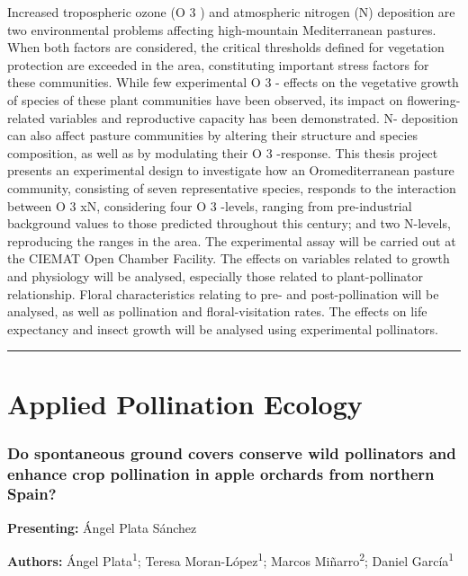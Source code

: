 \documentclass[
  letterpaper,
  DIV=11,
  numbers=noendperiod]{scrartcl}
\begin{document}
Increased tropospheric ozone (O 3 ) and atmospheric nitrogen (N)
deposition are two environmental problems affecting high-mountain
Mediterranean pastures. When both factors are considered, the critical
thresholds defined for vegetation protection are exceeded in the area,
constituting important stress factors for these communities. While few
experimental O 3 - effects on the vegetative growth of species of these
plant communities have been observed, its impact on flowering-related
variables and reproductive capacity has been demonstrated. N- deposition
can also affect pasture communities by altering their structure and
species composition, as well as by modulating their O 3 -response. This
thesis project presents an experimental design to investigate how an
Oromediterranean pasture community, consisting of seven representative
species, responds to the interaction between O 3 xN, considering four O
3 -levels, ranging from pre-industrial background values to those
predicted throughout this century; and two N-levels, reproducing the
ranges in the area. The experimental assay will be carried out at the
CIEMAT Open Chamber Facility. The effects on variables related to growth
and physiology will be analysed, especially those related to
plant-pollinator relationship. Floral characteristics relating to pre-
and post-pollination will be analysed, as well as pollination and
floral-visitation rates. The effects on life expectancy and insect
growth will be analysed using experimental pollinators.

\begin{center}\rule{0.5\linewidth}{0.5pt}\end{center}

\section{Applied Pollination Ecology}\label{applied-pollination-ecology}

\subsubsection{Do spontaneous ground covers conserve wild pollinators
and enhance crop pollination in apple orchards from northern
Spain?}\label{do-spontaneous-ground-covers-conserve-wild-pollinators-and-enhance-crop-pollination-in-apple-orchards-from-northern-spain}

\textbf{Presenting:} Ángel Plata Sánchez

\textbf{Authors:} Ángel Plata\textsuperscript{1}; Teresa
Moran-López\textsuperscript{1}; Marcos Miñarro\textsuperscript{2};
Daniel García\textsuperscript{1}
\end{document}
